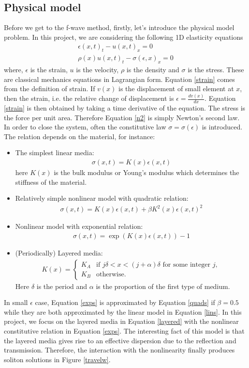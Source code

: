 \documentclass{article}
\begin{document}
\subsection{Physical model}
Before we get to the f-wave method, firstly, let's introduce the physical model problem. In this project, we are considering the following 1D elasticity equations
\begin{align}
\epsilon(x,t)_t-u(x,t)_x=0 \label{strain}\\
\rho(x) u(x,t)_t-\sigma(\epsilon,x)_x=0 \label{n2}
\end{align}
where, $\epsilon$ is the strain, $u$ is the velocity, $\rho$ is the density and $\sigma$ is the stress. These are classical mechanics equations in Lagrangian form. Equation \eqref{strain} comes from the definition of strain. If $v(x)$ is the displacement of small element at $x$, then the strain, i.e. the relative change of displacement is $\epsilon=\frac{dv(x)}{dx}$. Equation \eqref{strain} is then obtained by taking a time derivative of the equation. The stress is the force per unit area. Therefore Equation \eqref{n2} is simply Newton's second law. In order to close the system, often the constitutive law $\sigma=\sigma(\epsilon)$ is introduced. The relation depends on the material, for instance:
\begin{itemize}
\item The simplest linear media:
\begin{align}
\sigma(x,t)=K(x)\epsilon(x,t)
\label{lins}
\end{align}
here $K(x)$ is the bulk modulus or Young's modulus which determines the stiffness of the material.
\item Relatively simple nonlinear model with quadratic relation:
\begin{align}
\sigma(x,t)=K(x)\epsilon(x,t)+\beta K^2(x)\epsilon(x,t)^2
\label{quads}
\end{align}
\item Nonlinear model with exponential relation:
\begin{align}
\sigma(x,t)=\exp(K(x)\epsilon(x,t))-1
\label{exps}
\end{align}
\item (Periodically) Layered media:
\begin{align}
K(x)=\begin{cases}
K_A & \mbox{if }j\delta<x<(j+\alpha)\delta \mbox{ for some integer } j,\\
K_B & \mbox{otherwise.}
\end{cases}
\label{layered}
\end{align}
Here $\delta$ is the period and $\alpha$ is the proportion of the first type of medium.
\end{itemize}
In small $\epsilon$ case, Equation \eqref{exps} is approximated by Equation \eqref{quads} if $\beta=0.5$ while they are both approximated by the linear model in Equation \eqref{lins}. In this project, we focus on the layered media in Equation \eqref{layered} with the nonlinear constitutive relation in Equation \eqref{exps}. The interesting fact of this model is that the layered media gives rise to an effective dispersion due to the reflection and transmission. Therefore, the interaction with the nonlinearity finally produces soliton solutions in Figure \ref{travelw}.
\end{document}
